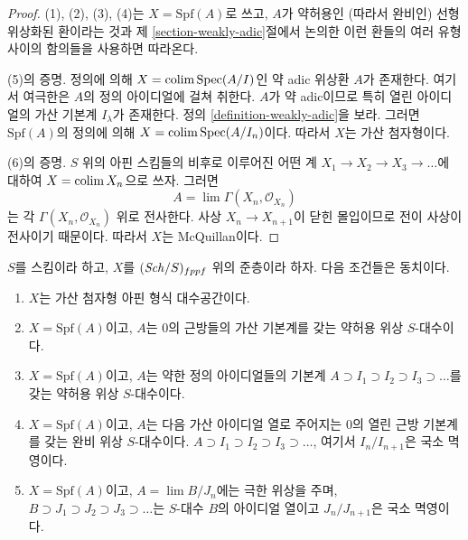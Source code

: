 \begin{proof}
(1), (2), (3), (4)는 $X = \text{Spf}(A)$로 쓰고, $A$가 약허용인
(따라서 완비인) 선형 위상화된 환이라는 것과 제
\ref{section-weakly-adic}절에서 논의한 이런 환들의 여러 유형 사이의
함의들을 사용하면 따라온다.

\medskip\noindent
(5)의 증명. 정의에 의해 $X = \mathop{\mathrm{colim}}\nolimits \mathop{\mathrm{Spec}}(A/I)$인 약 adic 위상환
$A$가 존재한다. 여기서 여극한은 $A$의 정의 아이디얼에 걸쳐 취한다.
$A$가 약 adic이므로 특히 열린 아이디얼의 가산 기본계
$I_\lambda$가 존재한다. 정의 \ref{definition-weakly-adic}을 보라.
그러면 $\text{Spf}(A)$의 정의에 의해
$X = \mathop{\mathrm{colim}}\nolimits \mathop{\mathrm{Spec}}(A/I_n)$이다. 따라서 $X$는 가산 첨자형이다.

\medskip\noindent
(6)의 증명. $S$ 위의 아핀 스킴들의 비후로 이루어진 어떤 계
$X_1 \to X_2 \to X_3 \to \ldots$에 대하여 $X = \mathop{\mathrm{colim}}\nolimits X_n$으로
쓰자. 그러면
$$
A = \lim \Gamma(X_n, \mathcal{O}_{X_n})
$$
는 각 $\Gamma(X_n, \mathcal{O}_{X_n})$ 위로 전사한다. 사상
$X_n \to X_{n + 1}$이 닫힌 몰입이므로 전이 사상이 전사이기 때문이다.
따라서 $X$는 McQuillan이다.
\end{proof}

\begin{lemma}
\label{lemma-countably-indexed}
$S$를 스킴이라 하고, $X$를 $(\mathit{Sch}/S)_{fppf}$ 위의 준층이라 하자.
다음 조건들은 동치이다.
\begin{enumerate}
\item $X$는 가산 첨자형 아핀 형식 대수공간이다.
\item $X = \text{Spf}(A)$이고, $A$는 $0$의 근방들의 가산 기본계를
갖는 약허용 위상 $S$-대수이다.
\item $X = \text{Spf}(A)$이고, $A$는 약한 정의 아이디얼들의 기본계
$A \supset I_1 \supset I_2 \supset I_3 \supset \ldots$를 갖는
약허용 위상 $S$-대수이다.
\item $X = \text{Spf}(A)$이고, $A$는 다음 가산 아이디얼 열로 주어지는
$0$의 열린 근방 기본계를 갖는 완비 위상 $S$-대수이다.
$A \supset I_1 \supset I_2 \supset I_3 \supset \ldots$,
여기서 $I_n/I_{n + 1}$은 국소 멱영이다.
\item $X = \text{Spf}(A)$이고, $A = \lim B/J_n$에는 극한 위상을 주며,
$B \supset J_1 \supset J_2 \supset J_3 \supset \ldots$는
$S$-대수 $B$의 아이디얼 열이고 $J_n/J_{n + 1}$은 국소 멱영이다.
\end{enumerate}
\end{lemma}

